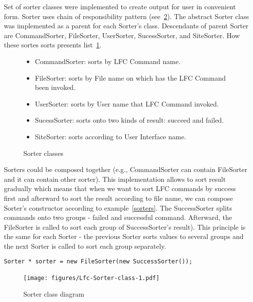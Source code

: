 \documentclass[a4paper, 11pt]{article} %
\begin{document}
Set of sorter classes were implemented to create output for user in convenient form. Sorter uses chain of responsibility pattern (see~\ref{fig:sorters}). The abstract Sorter class was implemented as a parent for each Sorter's class. Descendants of parent Sorter are CommandSorter, FileSorter, UserSorter, SucessSorter, and SiteSorter. How these sortes sorts presents list~\ref{enum:sorters}.

\begin{figure}[H]
  \centering
\begin{itemize}
\item CommandSorter: sorts by LFC Command name.
\item FileSorter: sorts by File name on which has the LFC Command been invoked.
\item UserSorter: sorts by User name that LFC Command invoked.
\item SucessSorter: sorts onto two kinds of result: succeed and failed.
\item SiteSorter: sorts according to User Interface name.
\end{itemize}
\caption{Sorter classes}
\label{enum:sorters}
\end{figure}

Sorters could be composed together (e.g., CommandSorter can contain FileSorter and it can contain other sorter). This implementation allows to sort result gradually which means that when we want to sort LFC commands by success first and afterward to sort the result according to file name, we can compose Sorter's constructor according to example~\ref{sorters}. The SuccessSorter splits commands onto two groups - failed and successful command. Afterward, the FileSorter is called to sort each group of SuccessSorter's result). This principle is the same for each Sorter - the previous Sorter sorts values to several groups and the next Sorter is called to sort each group separately.

\begin{center}
\begin{lstlisting}[style=cli, label={sorters}, caption={Composed sorters}]
Sorter * sorter = new FileSorter(new SuccessSorter());
\end{lstlisting}
\end{center}

\begin{figure}[H]
  \centering
    \texttt{[image: figures/Lfc-Sorter-class-1.pdf]}\
    \caption{Sorter class diagram}
    \label{fig:sorters}
\end{figure}
\end{document}
